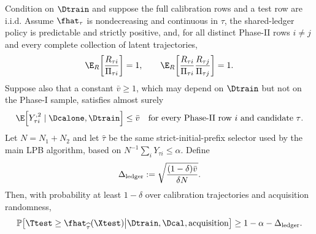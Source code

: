 \begin{theorem}
\label{thm:k2bc_shared_lpb}
Condition on $\Dtrain$ and suppose the full calibration rows and a test row
are i.i.d.  Assume $\fhat_\tau$ is nondecreasing and continuous in $\tau$,
the shared-ledger policy is predictable and strictly positive, and, for all
distinct Phase-II rows $i\ne j$ and every complete collection of latent
trajectories,
\begin{equation}
 \E_R\!\left[\frac{R_{\tau i}}{\Pi_{\tau i}}\right]=1,
 \qquad
 \E_R\!\left[
   \frac{R_{\tau i}}{\Pi_{\tau i}}
   \frac{R_{\tau j}}{\Pi_{\tau j}}
 \right]=1.
 \label{eq:k2bc_lpb_cross_moment}
\end{equation}
Suppose also that a constant $\bar v\geq1$, which may depend on $\Dtrain$
but not on the Phase-I sample, satisfies almost surely
\begin{equation}
 \E\!\left[Y_{\tau i}^{,2}\mid\Dcalone,\Dtrain\right]
 \leq\bar v
 \quad\text{for every Phase-II row $i$ and candidate $\tau$.}
 \label{eq:k2bc_lpb_second_moment}
\end{equation}
Let $N=N_1+N_2$ and let $\widehat\tau$ be the same strict-initial-prefix
selector used by the main LPB algorithm, based on
$N^{-1}\sum_iY_{\tau i}\leq\alpha$.  Define
\begin{equation}
 \Delta_{\rm ledger}
 :=\sqrt{\frac{(1-\delta)\bar v}{\delta N}}.
 \label{eq:k2bc_lpb_gap}
\end{equation}
Then, with probability at least $1-\delta$ over calibration trajectories and
acquisition randomness,
\begin{equation}
 \mathbb P\!\left[
   \Ttest\geq\fhat_{\widehat\tau}(\Xtest)
   \middle|\Dtrain,\Dcal,\text{acquisition}
 \right]
 \geq1-\alpha-\Delta_{\rm ledger}.
 \label{eq:k2bc_lpb_coverage}
\end{equation}
\end{theorem}

